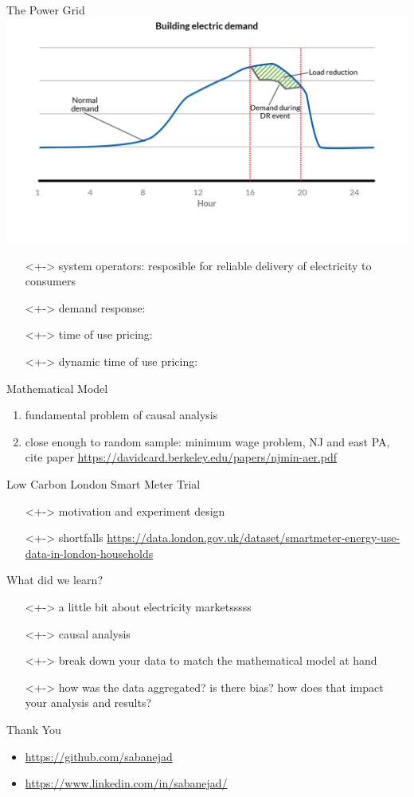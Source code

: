 \documentclass{beamer}
\begin{document}
\begin{frame}{The Power Grid}
  \includegraphics[width=1.00\textwidth]{images/demand-response.png}
  \begin{itemize}
  \item[]<+-> system operators: resposible for reliable delivery of electricity to consumers
  \item[]<+-> demand response: 
  \item[]<+-> time of use pricing:
  \item[]<+-> dynamic time of use pricing:
  \end{itemize}
\end{frame}

\begin{frame}{Mathematical Model}
  \begin{enumerate}
    \item fundamental problem of causal analysis
    \item close enough to random sample: minimum wage problem, NJ and east PA, cite paper
    \url{https://davidcard.berkeley.edu/papers/njmin-aer.pdf}
  \end{enumerate}
\end{frame}

\begin{frame}{Low Carbon London Smart Meter Trial}
  \begin{itemize}
    \item[]<+-> motivation and experiment design
    \item[]<+-> shortfalls
    \url{https://data.london.gov.uk/dataset/smartmeter-energy-use-data-in-london-households}
  \end{itemize}
\end{frame}

\begin{frame}{What did we learn?}
  \begin{itemize}
    \item[]<+-> a little bit about electricity marketsssss
    \item[]<+-> causal analysis
    \item[]<+-> break down your data to match the mathematical model at hand
    \item[]<+-> how was the data aggregated? is there bias? how does that impact your analysis and results?
  \end{itemize}
\end{frame}

\begin{frame}{Thank You}
  \begin{itemize}
  \item \url{https://github.com/sabanejad}
  \item \url{https://www.linkedin.com/in/sabanejad/}
  \end{itemize}
\end{frame}
\end{document}
